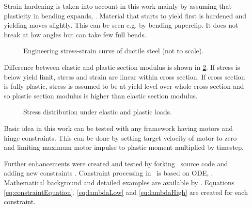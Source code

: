Strain hardening is taken into account in this work mainly by assuming that plasticity in bending expands, \citet[p.~672]{dowling}.
Material that starts to yield first is hardened and yielding moves slightly.
This can be seen e.g. by bending paperclip. It does not break at low angles but can take few full bends. 

\begin{figure}[htb!]
\centering
{}
\caption{Engineering stress-strain curve of ductile steel (not to scale).}
\label{fig:sscurve}
\end{figure}

Difference between elastic and plastic section modulus is shown in \ref{fig:wp}. 
If stress is below yield limit, stress and strain are linear within cross section.
If cross section is fully plastic, stress is assumed to be at yield level over whole cross section and 
so plastic section modulus is higher than elastic section modulus.

\begin{figure}[htb!]
\centering
{}
\hspace{1cm}
\caption{Stress distribution under elastic and plastic loads.}
\label{fig:wp}
\end{figure}

Basic idea in this work can be tested with any framework having motors and hinge constraints.
This can be done by setting target velocity of motor to zero and limiting maximum motor impulse to plastic moment 
multiplied by timestep.

Further enhancements were created and tested by forking \bullet\ source code
and adding new constraints \cite{pbullet}.
Constraint processing in \bullet\ is based on ODE, \cite{ode}.
Mathematical background and detailed examples are available by \cite{ode.joints}.
Equations \ref{eq:constraintEquation}, \ref{eq:lambdaLow} and
\ref{eq:lambdaHigh} 
are created for each constraint.

